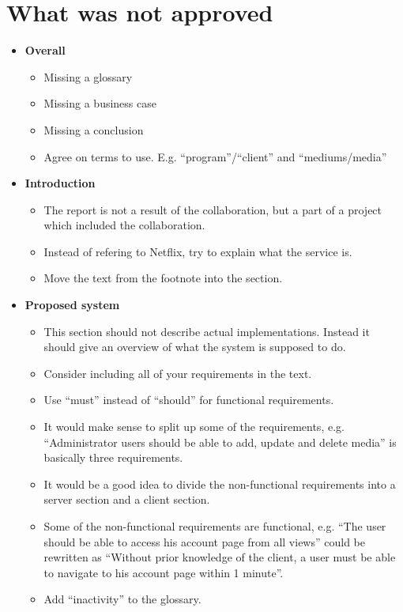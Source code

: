 \documentclass[]{article}
\begin{document}
\section*{What was not approved}
\begin{itemize}
\item \textbf{Overall}
	\begin{itemize}
	\item Missing a glossary
	\item Missing a business case
	\item Missing a conclusion
	\item Agree on terms to use. E.g. ``program''/``client'' and ``mediums/media'' \\
	\end{itemize}

\item \textbf{Introduction}
	\begin{itemize}
	\item The report is not a result of the collaboration, but a part of a project which included the collaboration.
	\item Instead of refering to Netflix, try to explain what the service is.
	\item Move the text from the footnote into the section.
	\end{itemize}

\item \textbf{Proposed system}
	\begin{itemize}
	\item This section should not describe actual implementations. Instead it should give an overview of what the system is supposed to do.
	\item Consider including all of your requirements in the text.
	\item Use ``must'' instead of ``should'' for functional requirements.
	\item It would make sense to split up some of the requirements, e.g. ``Administrator users should be able to add, update and delete media'' is basically three requirements.
	\item It would be a good idea to divide the non-functional requirements into a server section and a client section.
	\item Some of the non-functional requirements are functional, e.g. ``The user should be able to access his account page from all views'' could be rewritten as ``Without prior knowledge of the client, a user must be able to navigate to his account page within 1 minute''.
	\item Add ``inactivity'' to the glossary.	
	\end{itemize}


\end{itemize}
\end{document}
